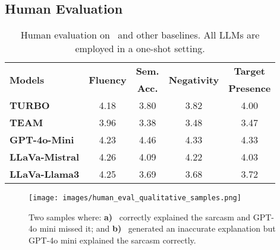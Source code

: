 \subsection{Human Evaluation}
\label{sec:human-eval}
\begin{table}
\setlength{\tabcolsep}{1mm}
\small
  \centering
  \begin{tabular}{lcccc}
    \toprule

    \multirow{2}{*}{\textbf{Models}} & \multirow{2}{*}{\textbf{Fluency}} &  \bf Sem. & \multirow{2}{*}{\textbf{Negativity}} & \bf Target \\ 
     &  & \bf Acc. &  & \bf Presence \\  
    
     
     \midrule
    \textbf{TURBO} & 4.18 & 3.80 & 3.82 & 4.00 \\ \midrule
    \textbf{TEAM} & 3.96 & 3.38 & 3.48 & 3.47\\ \midrule
    \textbf{GPT-4o-Mini} & 4.23 & 4.46 & 4.33 & 4.33\\
    \textbf{LLaVa-Mistral} & 4.26 & 4.09 & 4.22 & 4.03\\
    \textbf{LLaVa-Llama3} & 4.25 & 3.69 & 3.68 & 3.72\\
    \bottomrule   
  \end{tabular}
  \caption{Human evaluation on \model\ and other baselines. All LLMs are employed in a one-shot setting.}
  \label{table:human-eval}
\end{table}

\begin{figure*}[t]
  \texttt{[image: images/human\_eval\_qualitative\_samples.png]}
  \caption{Two samples where: \textbf{a)} \model\ correctly explained the sarcasm and GPT-4o mini missed it; and \textbf{b)} \model\ generated an inaccurate explanation but GPT-4o mini explained the sarcasm correctly.}
  \label{fig:human-eval-qualitative-samples}
\end{figure*}

